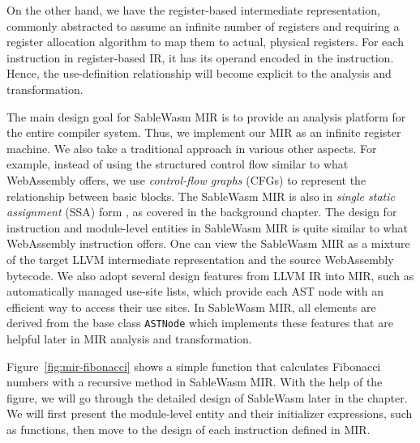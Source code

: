 On the other hand, we have the register-based intermediate representation,
commonly abstracted to assume an infinite number of registers and requiring a
register allocation algorithm to map them to actual, physical registers. For
each instruction in register-based IR, it has its operand encoded in the
instruction. Hence, the use-definition relationship will become explicit to the
analysis and transformation.

The main design goal for SableWasm MIR is to provide an analysis platform for
the entire compiler system. Thus, we implement our MIR as an infinite register
machine. We also take a traditional approach in various other aspects. For
example, instead of using the structured control flow similar to what
WebAssembly offers, we use \emph{control-flow graphs} (CFGs) to represent the
relationship between basic blocks. The SableWasm MIR is also in
\emph{single static assignment} (SSA) form \cite{ibm-ssa}, as covered in the
background chapter. The design for instruction and module-level entities in
SableWasm MIR is quite similar to what WebAssembly instruction offers. One can
view the SableWasm MIR as a mixture of the target LLVM intermediate
representation and the source WebAssembly bytecode. We also adopt several design
features from LLVM IR into MIR, such as automatically managed use-site lists,
which provide each AST node with an efficient way to access their use sites.
In SableWasm MIR, all elements are derived from the base class \texttt{ASTNode}
which implements these features that are helpful later in MIR analysis and
transformation.

Figure~\ref{fig:mir-fibonacci} shows a simple function that calculates Fibonacci
numbers with a recursive method in SableWasm MIR. With the help of the figure,
we will go through the detailed design of SableWasm later in the chapter. We
will first present the module-level entity and their initializer
expressions, such as functions, then move to the design of each instruction
defined in MIR.





